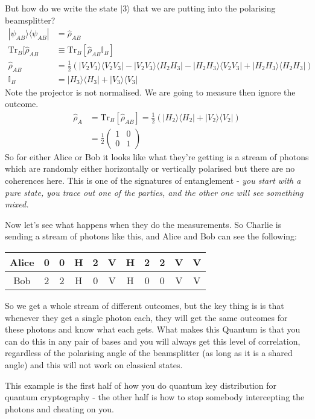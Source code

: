\documentclass[a4paper, 11pt, normalem]{report}
\newcommand\hrho{\hat{\rho}}
\begin{document}
But how do we write the state $|3\rangle$ that we are putting into the polarising beamsplitter?
\begin{align}
    |\psi_{AB}\rangle\langle\psi_{AB}| &= \hrho_{AB}  \\
    \text{Tr}_B[\hrho_{AB} &\equiv \text{Tr}_B[\hrho_{AB}\mathbb{I}_B] \\
    \hrho_{AB} &= \frac12\left(|V_2V_3\rangle\langle V_2V_3|-|V_2V_3\rangle\langle H_2H_3| - |H_2H_3\rangle\langle V_2V_3| + |H_2H_3\rangle\langle H_2H_3|\right) \\
    \mathbb{I}_B &= |H_3\rangle\langle H_3| + |V_3\rangle\langle V_3|
\end{align}
Note the projector is not normalised.
We are going to measure then ignore the outcome.
\begin{align}
    \hrho_A &= \text{Tr}_B[\hrho_{AB}] = \frac12\left(|H_2\rangle\langle H_2| + |V_2\rangle\langle V_2|\right) \\
            &= \frac12\begin{pmatrix} 1 & 0 \\ 0 & 1\end{pmatrix} 
\end{align} 
So for either Alice or Bob it looks like what they're getting is a stream of photons which are randomly either horizontally or vertically polarised but there are no coherences here.
This is one of the signatures of entanglement - \emph{you start with a pure state, you trace out one of the parties, and the other one will see something mixed.}

Now let's see what happens when they do the measurements. 
So Charlie is sending a stream of photons like this, and Alice and Bob can see the following:
\begin{table}[H]
    \centering
    \begin{tabular}{c|cccccccccc}
        Alice & 0 & 0 & H & 2 & V & H & 2 & 2 & V & V \\
        \hline
        Bob & 2 & 2 & H & 0 & V & H & 0 & 0 & V & V 
    \end{tabular}
\end{table}
So we get a whole stream of different outcomes, but the key thing is is that whenever they get a single photon each, they will get the same outcomes for these photons and know what each gets. 
What makes this Quantum is that you can do this in any pair of bases and you will always get this level of correlation, regardless of the polarising angle of the beamsplitter (as long as it is a shared angle) and this will not work on classical states.

This example is the first half of how you do quantum key distribution for quantum cryptography - the other half is how to stop somebody intercepting the photons and cheating on you. 


\end{document}
